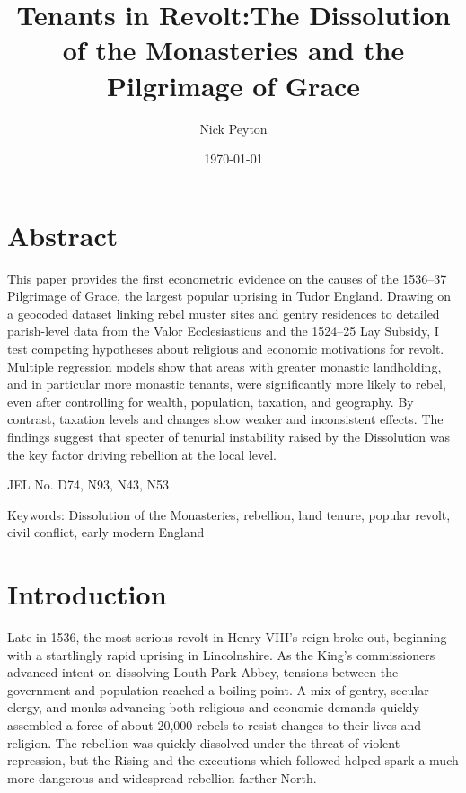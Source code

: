 \documentclass[12pt]{article}
\begin{document}
\begin{titlepage}
\title{Tenants in Revolt:\linebreak The Dissolution of the Monasteries and the Pilgrimage of Grace}
\author{Nick Peyton}
\date{\today}
\maketitle

\setcounter{page}{0}
\thispagestyle{empty}
\end{titlepage}
\pagebreak \newpage

\section*{Abstract}
This paper provides the first econometric evidence on the causes of the 1536–37 Pilgrimage of Grace, the largest popular uprising in Tudor England. Drawing on a geocoded dataset linking rebel muster sites and gentry residences to detailed parish-level data from the Valor Ecclesiasticus and the 1524–25 Lay Subsidy, I test competing hypotheses about religious and economic motivations for revolt. Multiple regression models show that areas with greater monastic landholding, and in particular more monastic tenants, were significantly more likely to rebel, even after controlling for wealth, population, taxation, and geography. By contrast, taxation levels and changes show weaker and inconsistent effects. The findings suggest that specter of tenurial instability raised by the Dissolution was the key factor driving rebellion at the local level.

\vspace*{\fill}
\noindent
JEL No. D74, N93, N43, N53

\noindent
Keywords: Dissolution of the Monasteries, rebellion, land tenure, popular revolt, civil conflict, early modern England

\pagebreak \newpage
\section{Introduction}

Late in 1536, the most serious revolt in Henry VIII's reign broke out, beginning with a startlingly rapid uprising in Lincolnshire. As the King's commissioners advanced intent on dissolving Louth Park Abbey, tensions between the government and population reached a boiling point. A mix of gentry, secular clergy, and monks advancing both religious and economic demands quickly assembled a force of about 20,000 rebels to resist changes to their lives and religion. The rebellion was quickly dissolved under the threat of violent repression, but the Rising and the executions which followed helped spark a much more dangerous and widespread rebellion farther North.\autocite[28]{Fletcher2008}
\end{document}
